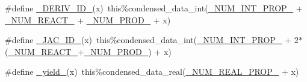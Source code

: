 \begin{DoxyCompactItemize}
\item 
\#define \mbox{\hyperlink{rxn__photolysis_8_f90_a8df20fa2e866ca68998160fdeef08b19}{\+\_\+\+D\+E\+R\+I\+V\+\_\+\+I\+D\+\_\+}}(x)~this\%condensed\+\_\+data\+\_\+int(\mbox{\hyperlink{sub__model___u_n_i_f_a_c_8_f90_a54f7194dc6a244f7eb7a78f88b3362ba}{\+\_\+\+N\+U\+M\+\_\+\+I\+N\+T\+\_\+\+P\+R\+O\+P\+\_\+}} + \mbox{\hyperlink{rxn__troe_8_f90_aee1fee52189b85b8a55162815b7eb2ab}{\+\_\+\+N\+U\+M\+\_\+\+R\+E\+A\+C\+T\+\_\+}} + \mbox{\hyperlink{rxn__troe_8_f90_a0ab2d7e00e334b5c52335f26ef6025e8}{\+\_\+\+N\+U\+M\+\_\+\+P\+R\+O\+D\+\_\+}} + x)
\item 
\#define \mbox{\hyperlink{rxn__photolysis_8_f90_af0ecfa7b0240c903b78101cd3e4ac0c7}{\+\_\+\+J\+A\+C\+\_\+\+I\+D\+\_\+}}(x)~this\%condensed\+\_\+data\+\_\+int(\mbox{\hyperlink{sub__model___u_n_i_f_a_c_8_f90_a54f7194dc6a244f7eb7a78f88b3362ba}{\+\_\+\+N\+U\+M\+\_\+\+I\+N\+T\+\_\+\+P\+R\+O\+P\+\_\+}} + 2$\ast$(\mbox{\hyperlink{rxn__troe_8_f90_aee1fee52189b85b8a55162815b7eb2ab}{\+\_\+\+N\+U\+M\+\_\+\+R\+E\+A\+C\+T\+\_\+}}+\mbox{\hyperlink{rxn__troe_8_f90_a0ab2d7e00e334b5c52335f26ef6025e8}{\+\_\+\+N\+U\+M\+\_\+\+P\+R\+O\+D\+\_\+}}) + x)
\item 
\#define \mbox{\hyperlink{rxn__photolysis_8_f90_a767b378bc7f42ea6f251cd44b8bc09da}{\+\_\+yield\+\_\+}}(x)~this\%condensed\+\_\+data\+\_\+real(\mbox{\hyperlink{sub__model___u_n_i_f_a_c_8_f90_a242fac7fe42c0d62936c65735dc023a6}{\+\_\+\+N\+U\+M\+\_\+\+R\+E\+A\+L\+\_\+\+P\+R\+O\+P\+\_\+}} + x)
\end{DoxyCompactItemize}
